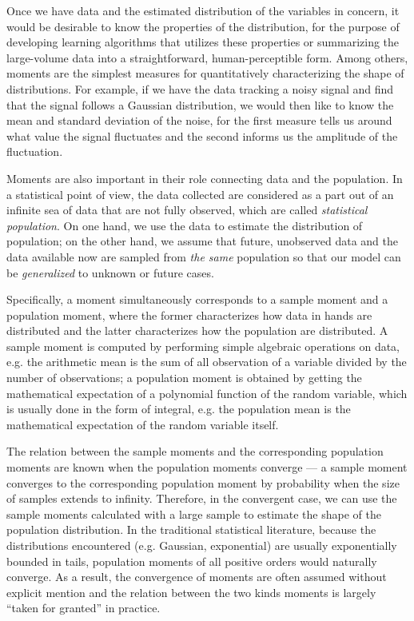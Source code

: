 Once we have data and the estimated distribution of the variables in concern, it would be desirable to know the properties of the distribution, for the purpose of developing learning algorithms that utilizes these properties or summarizing the large-volume data into a straightforward, human-perceptible form. Among others, moments are the simplest measures for quantitatively characterizing the shape of distributions. For example, if we have the data tracking a noisy signal and find that the signal follows a Gaussian distribution, we would then like to know the mean and standard deviation of the noise, for the first measure tells us around what value the signal fluctuates and the second informs us the amplitude of the fluctuation. 

Moments are also important in their role connecting data and the population. In a statistical point of view, the data collected are considered as a part out of an infinite sea of data that are not fully observed, which are called \textit{statistical population}. On one hand, we use the data to estimate the distribution of population; on the other hand, we assume that future, unobserved data and the data available now are sampled from \textit{the same} population so that our model can be \textit{generalized} to unknown or future cases. 

Specifically, a moment simultaneously corresponds to a sample moment and a population moment, where the former characterizes how data in hands are distributed and the latter characterizes how the population are distributed. A sample moment is computed by performing simple algebraic operations on data, e.g. the arithmetic mean is the sum of all observation of a variable divided by the number of observations; a population moment is obtained by getting the mathematical expectation of a polynomial function of the random variable, which is usually done in the form of integral, e.g. the population mean is the mathematical expectation of the random variable itself.  

The relation between the sample moments and the corresponding population moments are known when the population moments converge --- a sample moment converges to the corresponding population moment by probability when the size of samples extends to infinity. Therefore, in the convergent case, we can use the sample moments calculated with a large sample to estimate the shape of the population distribution. In the traditional statistical literature, because the distributions encountered (e.g. Gaussian, exponential) are usually exponentially bounded in tails, population moments of all positive orders would naturally converge. As a result, the convergence of moments are often assumed without explicit mention and the relation between the two kinds moments is largely ``taken for granted'' in practice.

